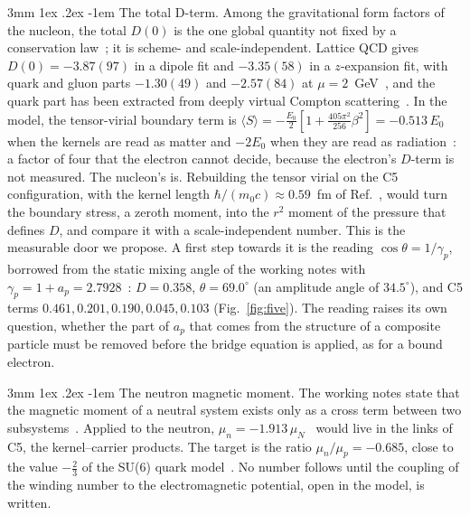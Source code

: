 \documentclass[%
 reprint, amsmath,amssymb, aps, prb, ]{revtex4-2}
\makeatletter
\numberwithin{equation}{section}
\renewcommand\paragraph{%
  \@startsection{paragraph}{4}{\z@}%
    {3mm \@plus 1ex \@minus .2ex}%
    {-1em}%
    {\normalfont\normalsize\itshape}}
\makeatother
\begin{document}
\paragraph{The total D-term.} Among the gravitational form factors of the nucleon, the total $D(0)$ is the one global quantity not fixed by a conservation law~\cite{ref:ps18}; it is scheme- and scale-independent. Lattice QCD gives $D(0)=-3.87(97)$ in a dipole fit and $-3.35(58)$ in a $z$-expansion fit, with quark and gluon parts $-1.30(49)$ and $-2.57(84)$ at $\mu=2$~GeV~\cite{ref:hps}, and the quark part has been extracted from deeply virtual Compton scattering~\cite{ref:burkert}. In the model, the tensor-virial boundary term is $\langle S\rangle=-\frac{E_0}{2}[1+\frac{405\pi^2}{256}\beta^2]=-0.513\,E_0$ when the kernels are read as matter and $-2E_0$ when they are read as radiation~\cite{ref:trunks}: a factor of four that the electron cannot decide, because the electron's $D$-term is not measured. The nucleon's is. Rebuilding the tensor virial on the C5 configuration, with the kernel length $\hbar/(m_0c)\approx0.59$~fm of Ref.~\cite{ref:p61}, would turn the boundary stress, a zeroth moment, into the $r^2$ moment of the pressure that defines $D$, and compare it with a scale-independent number. This is the measurable door we propose. A first step towards it is the reading $\cos\theta=1/\gamma_p$, borrowed from the static mixing angle of the working notes with $\gamma_p=1+a_p=2.7928$~\cite{ref:p61}: $D=0.358$, $\theta=69.0^\circ$ (an amplitude angle of $34.5^\circ$), and C5 terms $0.461,0.201,0.190,0.045,0.103$ (Fig.~\ref{fig:five}). The reading raises its own question, whether the part of $a_p$ that comes from the structure of a composite particle must be removed before the bridge equation is applied, as for a bound electron.

\paragraph{The neutron magnetic moment.} The working notes state that the magnetic moment of a neutral system exists only as a cross term between two subsystems~\cite{ref:trunks}. Applied to the neutron, $\mu_n=-1.913\,\mu_N$~\cite{ref:codata} would live in the links of C5, the kernel--carrier products. The target is the ratio $\mu_n/\mu_p=-0.685$, close to the value $-\frac23$ of the SU(6) quark model~\cite{ref:blp}. No number follows until the coupling of the winding number to the electromagnetic potential, open in the model, is written.
\end{document}
